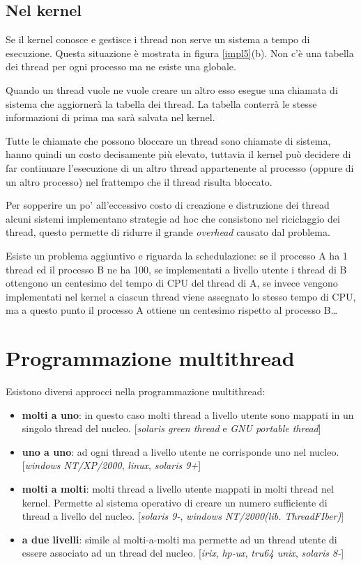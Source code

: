 \subsection{Nel kernel}

Se il kernel conosce e gestisce i thread non serve un sistema a tempo di esecuzione. Questa situazione è mostrata in figura \ref{impl5}(b). Non c'è una tabella dei thread per ogni processo ma ne esiste una globale.

Quando un thread vuole ne vuole creare un altro esso esegue una chiamata di sistema che aggiornerà la tabella dei thread. La tabella conterrà le stesse informazioni di prima ma sarà salvata nel kernel.

Tutte le chiamate che possono bloccare un thread sono chiamate di sistema, hanno quindi un costo decisamente più elevato, tuttavia il kernel può decidere di far continuare l'esecuzione di un altro thread appartenente al processo (oppure di un altro processo) nel frattempo che il thread risulta bloccato.

Per sopperire un po' all'eccessivo costo di creazione e distruzione dei thread alcuni sistemi implementano strategie ad hoc che consistono nel riciclaggio dei thread, questo permette di ridurre il grande \textit{overhead} causato dal problema.

Esiste un problema aggiuntivo e riguarda la schedulazione: se il processo A ha 1 thread ed il processo B ne ha 100, se implementati a livello utente i thread di B ottengono un centesimo del tempo di CPU del thread di A, se invece vengono implementati nel kernel a ciascun thread viene assegnato lo stesso tempo di CPU, ma a questo punto il processo A ottiene un centesimo rispetto al processo B\dots

\section{Programmazione multithread}

Esistono diversi approcci nella programmazione multithread:
\begin{itemize}
    \item \textbf{molti a uno}: in questo caso molti thread a livello utente sono mappati in un singolo thread del nucleo. [\textit{solaris green thread} e \textit{GNU portable thread}]
    \item \textbf{uno a uno}: ad ogni thread a livello utente ne corrisponde uno nel nucleo. [\textit{windows NT/XP/2000}, \textit{linux}, \textit{solaris 9+}]
    \item \textbf{molti a molti}: molti thread a livello utente mappati in molti thread nel kernel. Permette al sistema operativo di creare un numero sufficiente di thread a livello del nucleo. [\textit{solaris 9-}, \textit{windows NT/2000(lib. ThreadFIber)}]
    \item \textbf{a due livelli}: simile al molti-a-molti ma permette ad un thread utente di essere associato ad un thread del nucleo. [\textit{irix}, \textit{hp-ux}, \textit{tru64 unix}, \textit{solaris 8-}]
\end{itemize}

